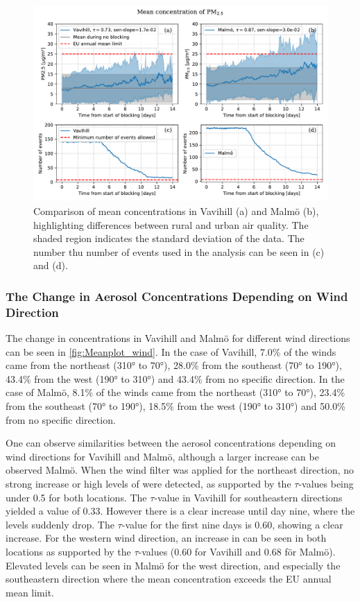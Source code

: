 \begin{figure}[H]
    \centering
    \includegraphics[width=\textwidth]{Figures/Meanplot.pdf}
    \caption{Comparison of mean \PM  concentrations in Vavihill (a) and Malmö (b), highlighting differences between rural and urban air quality. The shaded region indicates the standard deviation of the data. The number thu number of events used in the analysis can be seen in (c) and (d).}
    \label{fig:Meanplot_Comparison}
\end{figure}

\subsubsection{The Change in Aerosol Concentrations Depending on Wind Direction}

The change in \PM concentrations in Vavihill and Malmö for different wind directions can be seen in \autoref{fig:Meanplot_wind}. In the case of Vavihill, 7.0\% of the winds came from the northeast (310° to 70°), 28.0\% from the southeast (70° to 190°), 43.4\% from the west (190° to 310°) and 43.4\% from no specific direction. In the case of Malmö, 8.1\% of the winds came from the northeast (310° to 70°), 23.4\% from the southeast (70° to 190°), 18.5\% from the west (190° to 310°) and 50.0\% from no specific direction. 

One can observe similarities between the aerosol concentrations depending on wind directions for Vavihill and Malmö, although a larger increase can be observed Malmö. When the wind filter was applied for the northeast direction, no strong increase or high levels of \PM  were detected, as supported by the $\tau$-values being under 0.5 for both locations. The $\tau$-value in Vavihill for southeastern directions yielded a value of 0.33. However there is a clear increase until day nine, where the levels suddenly drop. The $\tau$-value for the first nine days is 0.60, showing a clear increase. For the western wind direction, an increase in \PM can be seen in both locations as supported by the $\tau$-values (0.60 for Vavihill and 0.68 för Malmö). Elevated levels can be seen in Malmö for the west direction, and especially the southeastern direction where the mean concentration exceeds the EU annual mean limit. 

